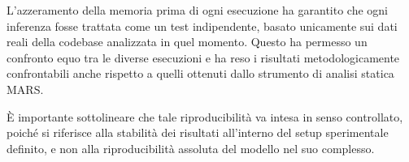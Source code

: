 L'azzeramento della memoria prima di ogni esecuzione ha garantito che ogni inferenza fosse trattata come un test indipendente, basato unicamente sui dati reali della codebase analizzata in quel momento. Questo ha permesso un confronto equo tra le diverse esecuzioni e ha reso i risultati metodologicamente confrontabili anche rispetto a quelli ottenuti dallo strumento di analisi statica MARS.

È importante sottolineare che tale riproducibilità va intesa in senso controllato, poiché si riferisce alla stabilità dei risultati all'interno del setup sperimentale definito, e non alla riproducibilità assoluta del modello nel suo complesso.



